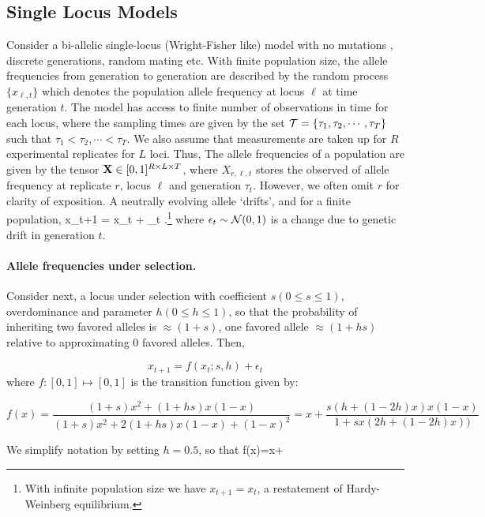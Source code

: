 \subsection*{Single Locus Models}
Consider a bi-allelic single-locus (Wright-Fisher like) model with no
mutations \cite{Ewens2012}, discrete generations, random mating
etc. With finite population size, the allele frequencies from
generation to generation are described by the random process
$\{x_{\ell,t}\}$ which denotes the population allele frequency at
locus $\ell$ at time generation $t$. The model has access to finite
number of observations in time for each locus, where the sampling
times are given by the set ${\cal T}=\{\tau_1,\tau_2,\cdots, \tau_T \}$
such that $\tau_1<\tau_2,\cdots<\tau_T$. We also assume that
measurements are taken up for $R$ experimental replicates for $L$
loci. Thus, The allele frequencies of a population are given by the
tensor ${\mathbf X} \in [0,1]^{R \times L \times T}$, where $X_{r,\ell,t}$
stores the observed of allele frequency at replicate $r$, locus $\ell$
and generation $\tau_t$. However, we often omit $r$ for clarity of
exposition. A neutrally evolving allele `drifts', and for a finite
population,
\beq x_{t+1} = x_t + \epsilon_t\; .\footnote{With infinite population size
  we have $x_{t+1} = x_t$, a restatement of Hardy-Weinberg
  equilibrium.}
\label{eq:drift}
\eeq where $\epsilon_t \sim {\cal N}(0,1)$ is a change due to genetic drift
in generation $t$.

\paragraph{Allele frequencies under selection.}
Consider next, a locus under selection with coefficient $s (0\le s\le
1)$, overdominance and parameter $h (0\le h\le 1)$, so that the
probability of inheriting two favored alleles is $\approx (1+s)$, one
favored allele $\approx (1+hs)$ relative to approximating $0$ favored
alleles. Then,


\begin{equation}
x_{t+1} = f(x_t;s,h) + \epsilon_t
\label{eq:trans0} 
\end{equation}
where $f: [0,1] \mapsto [0,1]$ is the
transition function given by:

\begin{equation}
f(x)=\frac{(1+s)x^2 + (1+hs)x(1-x)}{(1+s)x^2 + 2(1+hs)x(1-x) + (1-x)^2}
    =x+\frac{s(h+(1-2h)x)x(1-x)}{1+sx(2h+(1-2h)x))}
\end{equation}

We simplify notation by setting $h=0.5$, so that
\beq
f(x)=x+
\eeq

